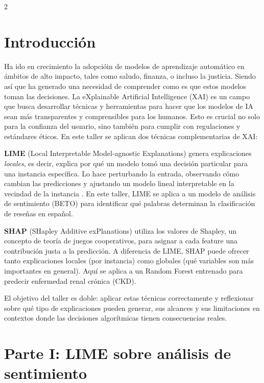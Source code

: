 \documentclass[12pt, a4paper]{article}
\begin{document}
\begin{multicols}{2}

\section{Introducción}

Ha ido en crecimiento la adopcióin de modelos de aprendizaje automático en ámbitos de alto impacto, tales como saludo, finanza, o incluso la justicia. Siendo así que ha generado una necesidad de comprender como es que estos modelos toman las decisiones.
La eXplainable Artificial Intelligence (XAI) es un campo que busca desarrollar técnicas y herramientas para hacer que los modelos de IA sean más transparentes y comprensibles para los humanos. Esto es crucial no solo para la confianza del usuario, sino también para cumplir con regulaciones y estándares éticos.
En este taller se aplican dos técnicas complementarias de XAI:

\textbf{LIME} (Local Interpretable Model-agnostic Explanations) genera explicaciones \textit{locales}, es decir, explica por qué un modelo tomó una decisión particular para una instancia específica. Lo hace perturbando la entrada, observando cómo cambian las predicciones y ajustando un modelo lineal interpretable en la vecindad de la instancia \cite{ribeiro2016should}. En este taller, LIME se aplica a un modelo de análisis de sentimiento (BETO) para identificar qué palabras determinan la clasificación de reseñas en español.

\textbf{SHAP} (SHapley Additive exPlanations) utiliza los valores de Shapley, un concepto de teoría de juegos cooperativos, para asignar a cada feature una contribución justa a la predicción. A diferencia de LIME, SHAP puede ofrecer tanto explicaciones locales (por instancia) como globales (qué variables son más importantes en general). Aquí se aplica a un Random Forest entrenado para predecir enfermedad renal crónica (CKD).

El objetivo del taller es doble: aplicar estas técnicas correctamente y reflexionar sobre qué tipo de explicaciones pueden generar, sus alcances y sus limitaciones en contextos donde las decisiones algorítmicas tienen consecuencias reales.

\section{Parte I: LIME sobre análisis de sentimiento}


\end{multicols}
\end{document}
